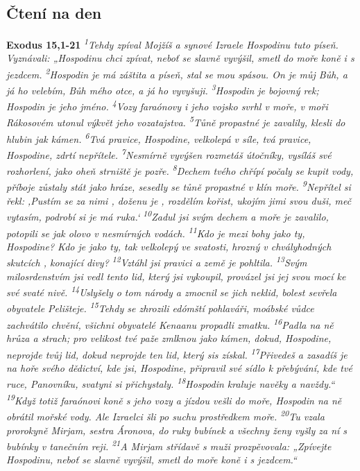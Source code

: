\documentclass[11pt]{article}
\begin{document}
\subsection*{Čtení na den}
\textbf{Exodus 15,1-21}
\newline
\textit{
\textsuperscript{1}Tehdy zpíval Mojžíš a synové Izraele Hospodinu tuto píseň. Vyznávali: „Hospodinu chci zpívat, neboť se slavně vyvýšil, smetl do moře koně i s jezdcem.
\textsuperscript{2}Hospodin je má záštita a píseň, stal se mou spásou. On je můj Bůh, a já ho velebím, Bůh mého otce, a já ho vyvyšuji.
\textsuperscript{3}Hospodin je bojovný rek; Hospodin je jeho jméno.
\textsuperscript{4}Vozy faraónovy i jeho vojsko svrhl v moře, v moři Rákosovém utonul výkvět jeho vozatajstva.
\textsuperscript{5}Tůně propastné je zavalily, klesli do hlubin jak kámen.
\textsuperscript{6}Tvá pravice, Hospodine, velkolepá v síle, tvá pravice, Hospodine, zdrtí nepřítele.
\textsuperscript{7}Nesmírně vyvýšen rozmetáš útočníky, vysíláš své rozhorlení, jako oheň strniště je pozře.
\textsuperscript{8}Dechem tvého chřípí počaly se kupit vody, příboje zůstaly stát jako hráze, sesedly se tůně propastné v klín moře.
\textsuperscript{9}Nepřítel si řekl: ‚Pustím se za nimi , doženu je , rozdělím kořist, ukojím jimi svou duši, meč vytasím, podrobí si je má ruka.‘
\textsuperscript{10}Zadul jsi svým dechem a moře je zavalilo, potopili se jak olovo v nesmírných vodách.
\textsuperscript{11}Kdo je mezi bohy jako ty, Hospodine? Kdo je jako ty, tak velkolepý ve svatosti, hrozný v chvályhodných skutcích , konající divy?
\textsuperscript{12}Vztáhl jsi pravici a země je pohltila.
\textsuperscript{13}Svým milosrdenstvím jsi vedl tento lid, který jsi vykoupil, provázel jsi jej svou mocí ke své svaté nivě.
\textsuperscript{14}Uslyšely o tom národy a zmocnil se jich neklid, bolest sevřela obyvatele Pelišteje.
\textsuperscript{15}Tehdy se zhrozili edómští pohlaváři, moábské vůdce zachvátilo chvění, všichni obyvatelé Kenaanu propadli zmatku.
\textsuperscript{16}Padla na ně hrůza a strach; pro velikost tvé paže zmlknou jako kámen, dokud, Hospodine, neprojde tvůj lid, dokud neprojde ten lid, který sis získal.
\textsuperscript{17}Přivedeš a zasadíš je na hoře svého dědictví, kde jsi, Hospodine, připravil své sídlo k přebývání, kde tvé ruce, Panovníku, svatyni si přichystaly.
\textsuperscript{18}Hospodin kraluje navěky a navždy.“
\textsuperscript{19}Když totiž faraónovi koně s jeho vozy a jízdou vešli do moře, Hospodin na ně obrátil mořské vody. Ale Izraelci šli po suchu prostředkem moře.
\textsuperscript{20}Tu vzala prorokyně Mirjam, sestra Áronova, do ruky bubínek a všechny ženy vyšly za ní s bubínky v tanečním reji.
\textsuperscript{21}A Mirjam střídavě s muži prozpěvovala: „Zpívejte Hospodinu, neboť se slavně vyvýšil, smetl do moře koně i s jezdcem.“
}
\end{document}
